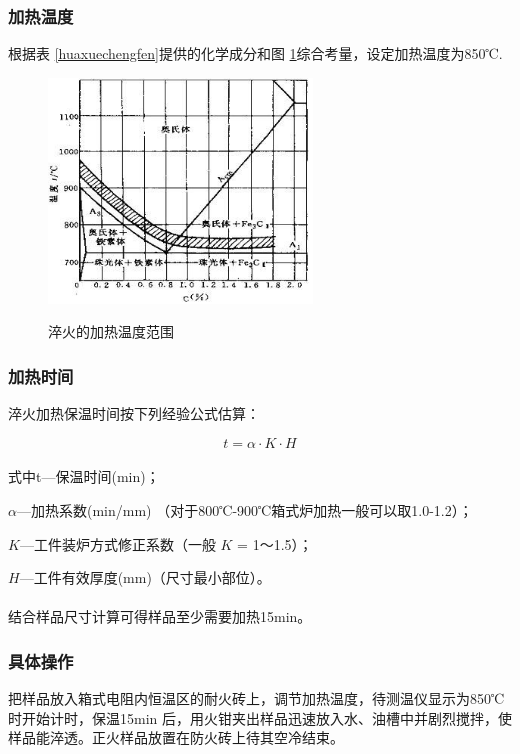 \documentclass[12pt]{ctexart}
\begin{document}
\subsubsection{加热温度}
根据表 \ref{huaxuechengfen}提供的化学成分和图 \ref{cuihuowendu}综合考量，设定加热温度为850℃.
\newpage
\begin{figure}[h]
  \centering
  \includegraphics[width=7cm]{cuihuowendu.jpg}\\
  \caption{淬火的加热温度范围}\label{cuihuowendu}
\end{figure}

\subsubsection{加热时间}
淬火加热保温时间按下列经验公式估算：

\[t = \alpha  \cdot K \cdot H\]

\paragraph{}
式中t—保温时间(min)；

    $\alpha$—加热系数(min/mm) （对于800℃-900℃箱式炉加热一般可以取1.0-1.2）；

    $K$—工件装炉方式修正系数（一般 $K$ = 1～1.5）；

    $H$—工件有效厚度(mm)（尺寸最小部位）。
\paragraph{}
结合样品尺寸计算可得样品至少需要加热15min。
\subsubsection{具体操作}
把样品放入箱式电阻内恒温区的耐火砖上，调节加热温度，待测温仪显示为850℃时开始计时，保温15min 后，用火钳夹出样品迅速放入水、油槽中并剧烈搅拌，使样品能淬透。正火样品放置在防火砖上待其空冷结束。
\end{document}
